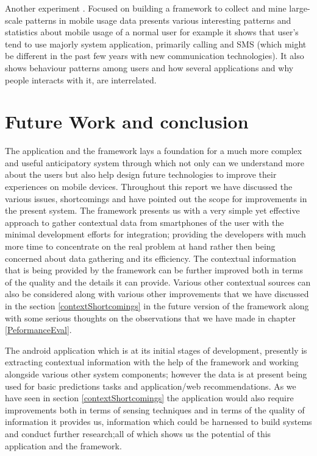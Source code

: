 \documentclass[12pt]{report}
\begin{document}
Another experiment \cite{do2010their}. Focused on building a framework to collect and mine large-scale patterns in mobile usage data presents various interesting patterns and statistics about mobile usage of a normal user for example it shows that user's tend to use majorly system application, primarily calling and SMS (which might be different in the past few years with new communication technologies). It also shows behaviour patterns among users and how several applications and why people interacts with it, are interrelated.

\chapter{Future Work and conclusion}
The application and the framework lays a foundation for a much more complex and useful anticipatory system through which not only can we understand more about the users but also help design future technologies to improve their experiences on mobile devices. Throughout this report we have discussed the various issues, shortcomings and have pointed out the scope for improvements in the present system. The framework presents us with a very simple yet effective approach to gather contextual data from smartphones of the user with the minimal development efforts for integration; providing the developers with much more time to concentrate on the real problem at hand rather then being concerned about data gathering and its efficiency. The contextual information that is being provided by the framework can be further improved both in terms of the quality and the details it can provide. Various other contextual sources can also be considered along with various other improvements that we have discussed in the section \ref{contextShortcomings} in the future version of the framework along with some serious thoughts on the observations that we have made in chapter \ref{PeformanceEval}.

The android application which is at its initial stages of development, presently is extracting contextual information with the help of the framework and working alongside various other system components; however the data is at present being used for basic predictions tasks and application/web recommendations. As we have seen in section \ref{contextShortcomings} the application would also require improvements both in terms of sensing techniques and in terms of the quality of information it provides us, information which could be harnessed to build systems and conduct further research;all of which shows us the potential of this application and the framework.
\end{document}
